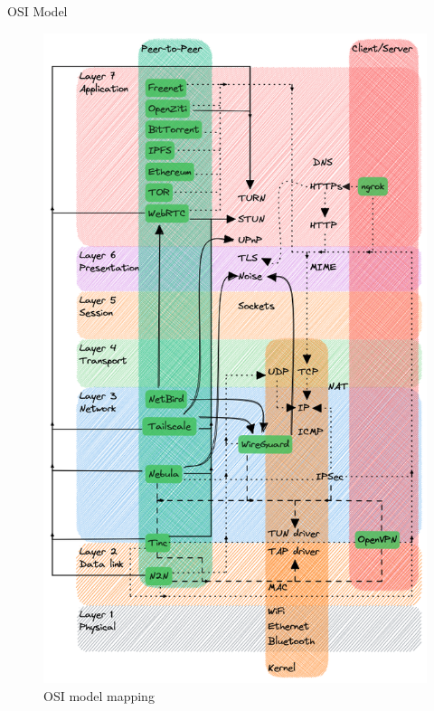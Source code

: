 \begin{frame}{OSI Model}
\begin{figure}
\centering
\includegraphics[width=\textwidth,height=0.9\textheight]{notes/../figures/osi-map.excalidraw.png}
\caption{OSI model mapping}
\end{figure}

\newpage


\end{frame}
